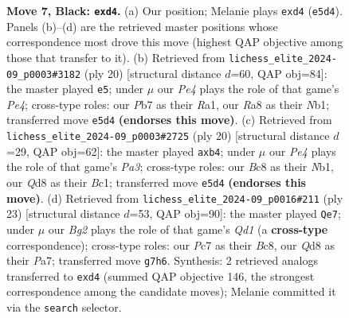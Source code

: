 \documentclass[11pt]{article}
\begin{document}
\begin{figure}[p]
\caption{\textbf{Move 7, Black: \texttt{exd4}.} (a) Our position; Melanie plays \texttt{exd4} (\texttt{e5d4}). Panels (b)--(d) are the retrieved master positions whose correspondence most drove this move (highest QAP objective among those that transfer to it). (b) Retrieved from \texttt{lichess\_elite\_2024-09\_p0003\#3182} (ply 20) [structural distance $d$=60, QAP obj=84]: the master played \texttt{e5}; under $\mu$ our \emph{Pe4} plays the role of that game's \emph{Pe4}; cross-type roles: our \emph{P}b7 as their \emph{R}a1, our \emph{R}a8 as their \emph{N}b1; transferred move \texttt{e5d4} \textbf{(endorses this move)}. (c) Retrieved from \texttt{lichess\_elite\_2024-09\_p0003\#2725} (ply 20) [structural distance $d$=29, QAP obj=62]: the master played \texttt{axb4}; under $\mu$ our \emph{Pe4} plays the role of that game's \emph{Pa3}; cross-type roles: our \emph{B}c8 as their \emph{N}b1, our \emph{Q}d8 as their \emph{B}c1; transferred move \texttt{e5d4} \textbf{(endorses this move)}. (d) Retrieved from \texttt{lichess\_elite\_2024-09\_p0016\#211} (ply 23) [structural distance $d$=53, QAP obj=90]: the master played \texttt{Qe7}; under $\mu$ our \emph{Bg2} plays the role of that game's \emph{Qd1} (a \textbf{cross-type} correspondence); cross-type roles: our \emph{P}c7 as their \emph{B}c8, our \emph{Q}d8 as their \emph{P}a7; transferred move \texttt{g7h6}. Synthesis: 2 retrieved analogs transferred to \texttt{exd4} (summed QAP objective 146, the strongest correspondence among the candidate moves); Melanie committed it via the \texttt{search} selector.}
\label{fig:thought-m13}
\end{figure}

\clearpage
\end{document}
